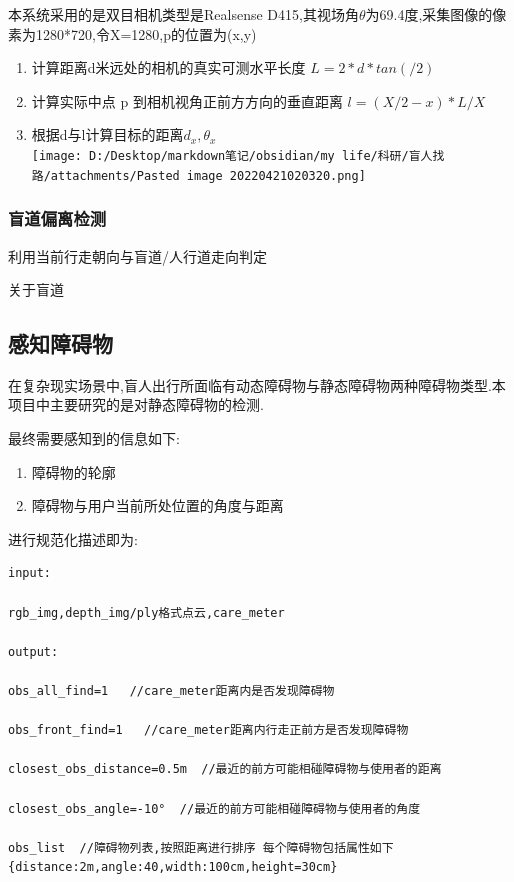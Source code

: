 \documentclass[]{article}
\begin{document}
本系统采用的是双目相机类型是Realsense
D415,其视场角\(\theta\)为69.4度,采集图像的像素为1280*720,令X=1280,p的位置为(x,y)

\begin{enumerate}
\def\labelenumi{\arabic{enumi}.}
\item
  计算距离d米远处的相机的真实可测水平长度 \(L=2*d*tan(/ 2)\) 
\item
  计算实际中点 p 到相机视角正前方方向的垂直距离 \(l=(X/2-x)*L/X\)
\item
  根据d与l计算目标的距离\(d_{x},\theta_{x}\) \\
  \texttt{[image: D:/Desktop/markdown笔记/obsidian/my life/科研/盲人找路/attachments/Pasted image 20220421020320.png]}
\end{enumerate}

\hypertarget{ux76f2ux9053ux504fux79bbux68c0ux6d4b}{%
\subsubsection{盲道偏离检测}\label{ux76f2ux9053ux504fux79bbux68c0ux6d4b}}

利用当前行走朝向与盲道/人行道走向判定

关于盲道

\hypertarget{ux611fux77e5ux969cux788dux7269}{%
\subsection{感知障碍物}\label{ux611fux77e5ux969cux788dux7269}}

在复杂现实场景中,盲人出行所面临有动态障碍物与静态障碍物两种障碍物类型.本项目中主要研究的是对静态障碍物的检测.

最终需要感知到的信息如下:

\begin{enumerate}
\def\labelenumi{\arabic{enumi}.}
\item
  障碍物的轮廓
\item
  障碍物与用户当前所处位置的角度与距离
\end{enumerate}

进行规范化描述即为:

\begin{verbatim}
input:

rgb_img,depth_img/ply格式点云,care_meter

output:

obs_all_find=1   //care_meter距离内是否发现障碍物

obs_front_find=1   //care_meter距离内行走正前方是否发现障碍物

closest_obs_distance=0.5m  //最近的前方可能相碰障碍物与使用者的距离

closest_obs_angle=-10°  //最近的前方可能相碰障碍物与使用者的角度

obs_list  //障碍物列表,按照距离进行排序 每个障碍物包括属性如下{distance:2m,angle:40,width:100cm,height=30cm}
\end{verbatim}
\end{document}
